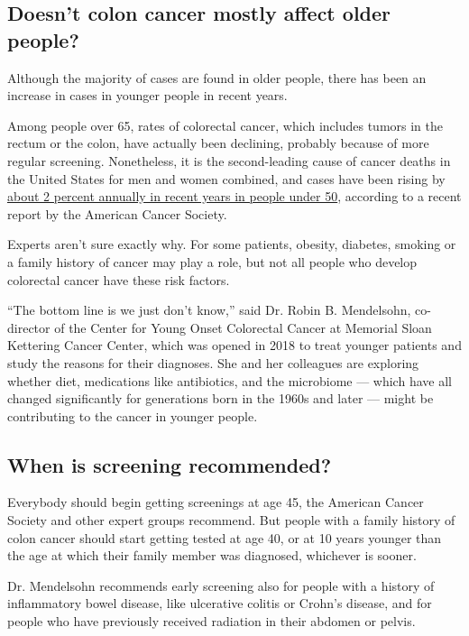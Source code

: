 \hypertarget{doesnt-colon-cancer-mostly-affect-older-people}{%
\subsection{Doesn't colon cancer mostly affect older
people?}\label{doesnt-colon-cancer-mostly-affect-older-people}}

Although the majority of cases are found in older people, there has been
an increase in cases in younger people in recent years.

Among people over 65, rates of colorectal cancer, which includes tumors
in the rectum or the colon, have actually been declining, probably
because of more regular screening. Nonetheless, it is the second-leading
cause of cancer deaths in the United States for men and women combined,
and cases have been rising by
\href{https://acsjournals.onlinelibrary.wiley.com/doi/full/10.3322/caac.21601}{about
2 percent annually in recent years in people under 50}, according to a
recent report by the American Cancer Society.

Experts aren't sure exactly why. For some patients, obesity, diabetes,
smoking or a family history of cancer may play a role, but not all
people who develop colorectal cancer have these risk factors.

``The bottom line is we just don't know,'' said Dr. Robin B. Mendelsohn,
co-director of the Center for Young Onset Colorectal Cancer at Memorial
Sloan Kettering Cancer Center, which was opened in 2018 to treat younger
patients and study the reasons for their diagnoses. She and her
colleagues are exploring whether diet, medications like antibiotics, and
the microbiome --- which have all changed significantly for generations
born in the 1960s and later --- might be contributing to the cancer in
younger people.

\hypertarget{when-is-screening-recommended}{%
\subsection{When is screening
recommended?}\label{when-is-screening-recommended}}

Everybody should begin getting screenings at age 45, the American Cancer
Society and other expert groups recommend. But people with a family
history of colon cancer should start getting tested at age 40, or at 10
years younger than the age at which their family member was diagnosed,
whichever is sooner.

Dr. Mendelsohn recommends early screening also for people with a history
of inflammatory bowel disease, like ulcerative colitis or Crohn's
disease, and for people who have previously received radiation in their
abdomen or pelvis.

